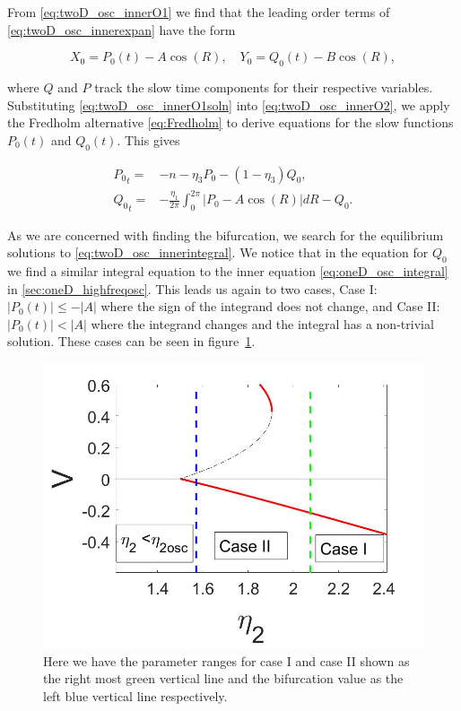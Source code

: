 From \eqref{eq:twoD_osc_innerO1} we find that the leading order terms of \eqref{eq:twoD_osc_innerexpan} have the form 

\begin{equation}\label{eq:twoD_osc_innerO1soln}
X_0=P_0(t)-A\cos(R),\quad Y_0=Q_0(t)-B\cos(R),
\end{equation}
 
where $Q$ and $P$ track the slow time components for their respective variables. Substituting \eqref{eq:twoD_osc_innerO1soln} into \eqref{eq:twoD_osc_innerO2}, we apply the Fredholm alternative \eqref{eq:Fredholm} to derive equations for the slow functions $P_0(t)$ and $Q_0(t)$. This gives

\begin{equation}\label{eq:twoD_osc_innerintegral}
\begin{aligned}
{P_0}_t =& -n -\eta_3P_0-(1-\eta_3)Q_0,\\
{Q_0}_t =& -\frac{\eta_1}{2\pi}\int_0^{2\pi}|P_0-A\cos(R)|dR-Q_0.
\end{aligned}
\end{equation}

\indent As we are concerned with finding the bifurcation, we search for the equilibrium solutions to \eqref{eq:twoD_osc_innerintegral}. We notice that in the equation for $Q_0$ we find a similar integral equation to the inner equation \eqref{eq:oneD_osc_integral} in \autoref{sec:oneD_highfreqosc}. This leads us again to two cases, Case I: $|P_0(t)|\le -|A|$ where the sign of the integrand does not change, and Case II: $|P_0(t)|<|A|$ where the integrand changes and the integral has a non-trivial solution. These cases can be seen in figure~\ref{fig:twoD_osc_cases}.

\begin{figure}[H]
\centering
\includegraphics[width = .7\linewidth]{twoD/osc_cases.jpg}
\caption{Here we have the parameter ranges for case I and case II shown as the right most green vertical line and the bifurcation value as the left blue vertical line respectively.}
\label{fig:twoD_osc_cases}
\end{figure}

